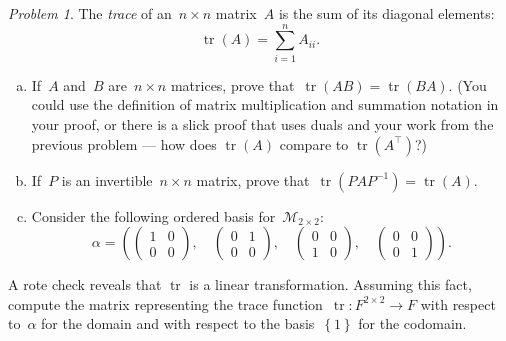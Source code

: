 \documentclass[11pt,twoside]{amsart}
\theoremstyle{plain}
\theoremstyle{remark}
\newtheorem{prob}{Problem}
\theoremstyle{definition}
\theoremstyle{definition}
\newcommand{\tr}{\operatorname{tr}}
\begin{document}
\begin{prob}
The {\em trace} of an~$n\times n$ matrix~$A$ is the sum of its diagonal
    elements:
    \[
      \tr(A)=\sum_{i=1}^nA_{ii}.
    \]
    \begin{enumerate}[(a)]
      \item If~$A$ and~$B$ are~$n\times n$ matrices, prove
  that~$\tr(AB)=\tr(BA)$. (You could use the definition of matrix multiplication and
    summation notation in your proof, or there is a slick proof that uses duals and your work from the previous problem --- how does $\tr(A)$ compare to $\tr(A^\top)$?)
      \item If~$P$ is an invertible~$n\times n$ matrix, prove
  that~$\tr(PAP^{-1})=\tr(A)$.
      \item Consider the following ordered basis
  for~$\mathcal{M}_{2\times 2}$:
  \[
\alpha=
\left(
\left(\begin{array}{cc}
    1&0\\0&0
\end{array} \right),\quad
\left(\begin{array}{cc}
    0&1\\0&0
\end{array} \right),\quad
\left(\begin{array}{cc}
    0&0\\1&0
\end{array} \right),\quad
\left(\begin{array}{cc}
    0&0\\0&1
\end{array} \right)
\right).
  \]
    \end{enumerate}
A rote check reveals that $\tr$ is a linear transformation. Assuming this fact, compute the matrix representing the trace
function~$\tr\colon F^{2\times 2}\to F$ with respect to~$\alpha$ for the
domain and with respect to the basis~$\left\{ 1 \right\}$ for the codomain.
\end{prob}
\end{document}
